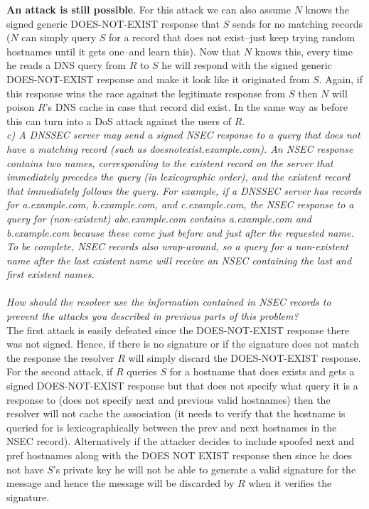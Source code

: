 \textbf{An attack is still possible}. For this attack we can also assume $N$ knows the signed generic DOES-NOT-EXIST response that $S$ sends for no matching records ($N$ can simply query $S$ for a record that does not exist--just keep trying random hostnames until it gets one--and learn this). Now that $N$ knows this, every time he reads a DNS query from $R$ to $S$ he will respond with the signed generic DOES-NOT-EXIST response and make it look like it originated from $S$. Again, if this response wins the race against the legitimate response from $S$ then $N$ will poison $R$'s DNS cache in case that record did exist. In the same way as before this can turn into a DoS attack against the users of $R$.\\

\noindent \textit{c) A DNSSEC server may send a signed NSEC response to a query that does not have a matching record (such as doesnotexist.example.com). An NSEC response contains two names, corresponding to the existent record on the server that immediately precedes the query (in lexicographic order), and the existent record that immediately follows the query. For example, if a DNSSEC server has records for a.example.com, b.example.com, and c.example.com, the NSEC response to a query for (non-existent) abc.example.com contains a.example.com and b.example.com because these come just before and just after the requested name. To be complete, NSEC records also wrap-around, so a query for a non-existent name after the last existent name will receive an NSEC containing the last and first existent names.\\\\
How should the resolver use the information contained in NSEC records to prevent the attacks you described in previous parts of this problem?}\\

The first attack is easily defeated since the DOES-NOT-EXIST response there was not signed. Hence, if there is no signature or if the signature does not match the response the resolver $R$ will simply discard the DOES-NOT-EXIST response. For the second attack, if $R$ queries $S$ for a hostname that does exists and gets a signed DOES-NOT-EXIST response but that does not specify what query it is a response to (does not specify next and previous valid hostnames) then the resolver will not cache the association (it needs to verify that the hostname is queried for is lexicographically between the prev and next hostnames in the NSEC record). Alternatively if the attacker decides to include spoofed next and pref hostnames along with the DOES NOT EXIST response then since he does not have $S$'s private key he will not be able to generate a valid signature for the message and hence the message will be discarded by $R$ when it verifies the signature. \\

